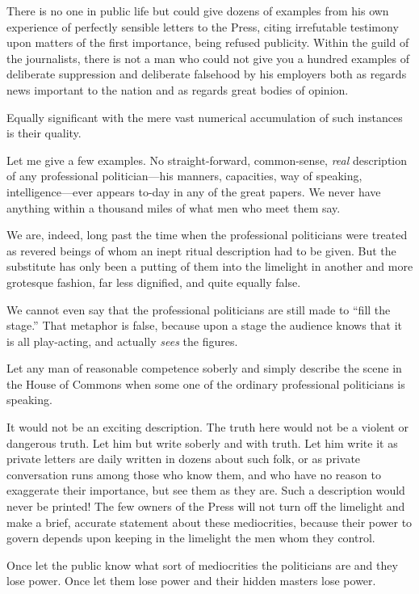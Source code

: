 \documentclass{book}
\begin{document}
There is no one in public life but could give dozens of examples from his own experience of perfectly sensible letters to the Press, citing irrefutable testimony upon matters of the first importance, being refused publicity. Within the guild of the journalists, there is not a man who could not give you a hundred examples of deliberate suppression and deliberate falsehood by his employers both as regards news important to the nation and as regards great bodies of opinion.

Equally significant with the mere vast numerical accumulation of such instances is their quality.

Let me give a few examples. No straight-forward, common-sense, \emph{real} description of any professional politician—his manners, capacities, way of speaking, intelligence—ever appears to-day in any of the great papers. We never have anything within a thousand miles of what men who meet them say.

We are, indeed, long past the time when the professional politicians were treated as revered beings of whom an inept ritual description had to be given. But the substitute has only been a putting of them into the limelight in another and more grotesque fashion, far less dignified, and quite equally false.

We cannot even say that the professional politicians are still made to “fill the stage.” That metaphor is false, because upon a stage the audience knows that it is all play-acting, and actually \emph{sees} the figures.

Let any man of reasonable competence soberly and simply describe the scene in the House of Commons when some one of the ordinary professional politicians is speaking.

It would not be an exciting description. The truth here would not be a violent or dangerous truth. Let him but write soberly and with truth. Let him write it as private letters are daily written in dozens about such folk, or as private conversation runs among those who know them, and who have no reason to exaggerate their importance, but see them as they are. Such a description would never be printed! The few owners of the Press will not turn off the limelight and make a brief, accurate statement about these mediocrities, because their power to govern depends upon keeping in the limelight the men whom they control.

Once let the public know what sort of mediocrities the politicians are and they lose power. Once let them lose power and their hidden masters lose power.
\end{document}

